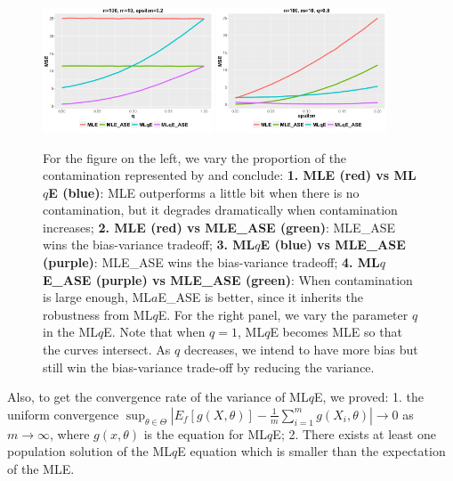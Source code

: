 \documentclass[simplex.tex]{subfiles}
\begin{document}
\begin{figure}[h!] 
\begin{cframed} 
\centering
\includegraphics[width=0.45\textwidth]{../../figs/robQ.png}
\hspace{6pt}
\includegraphics[width=0.45\textwidth]{../../figs/robEps.png} 
\caption{
For the figure on the left, we vary the proportion of the contamination
represented by  and conclude: \textbf{1. MLE (red) vs ML$q$E 
(blue)}: MLE outperforms a little bit when there is no
contamination, but it degrades dramatically when contamination
increases; \textbf{2. MLE (red) vs MLE\_ASE (green)}: MLE\_ASE wins
the bias-variance tradeoff; 
\textbf{3. ML$q$E  (blue) vs MLE\_ASE (purple)}: 
MLE\_ASE wins the bias-variance tradeoff; 
\textbf{4.  ML$q$E\_ASE (purple) vs MLE\_ASE (green)}: 
When contamination is large enough, ML$a$E\_ASE is better, since it 
inherits the robustness from ML$q$E.  For the right panel, we vary 
the parameter $q$ in the ML$q$E.  Note that when $q=1$, ML$q$E becomes 
MLE so that the curves intersect. As $q$ decreases, we intend to have 
more bias but still win the bias-variance trade-off by reducing the variance.
}
\label{fig:rlolg} 
\end{cframed}
\end{figure}



Also, to get the convergence rate of the variance of ML$q$E, we
proved: 1. the uniform convergence $\sup_{\theta \in \Theta} \left|
E_f[g(X, \theta)] − \frac{1}{m} \sum_{i=1}^m g(X_i, \theta) \right| \to
0$ as $m \to \infty$, where $g(x, \theta)$ is the equation for
ML$q$E; 2. There exists at least one population solution of the
ML$q$E equation which is smaller than the expectation of the MLE.
\end{document}
